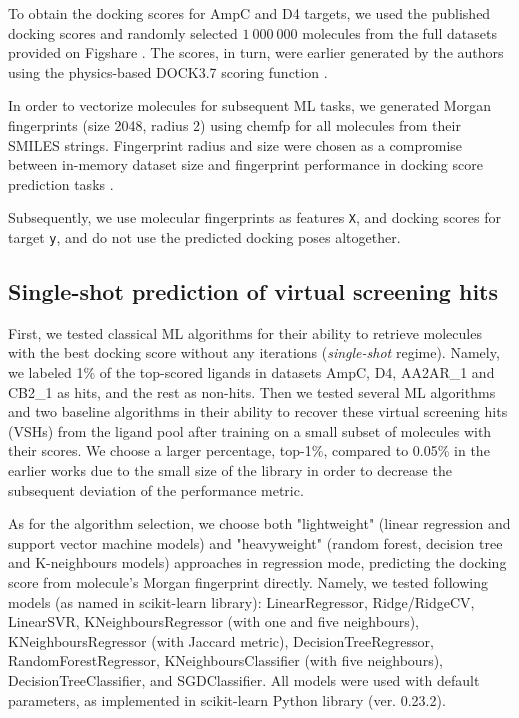 To obtain the docking scores for AmpC and D4 targets, we used the published docking scores \cite{ultralarge_docking_first} and randomly selected $1\ 000\ 000$ molecules from the full datasets provided on Figshare \cite{ultralarge_docking_first}. The scores, in turn, were earlier generated by the authors using the physics-based DOCK3.7 scoring function \cite{Coleman2013}.

In order to vectorize molecules for subsequent ML tasks, we generated Morgan fingerprints (size 2048, radius 2) using chemfp \cite{Dalke2019} for all molecules from their SMILES strings. Fingerprint radius and size were chosen as a compromise between in-memory dataset size and fingerprint performance in docking score prediction tasks \cite{logistic_regression}.

Subsequently, we use molecular fingerprints as features \texttt{X}, and docking scores for target \texttt{y}, and do not use the predicted docking poses altogether.

\subsection{Single-shot prediction of virtual screening hits}
First, we tested classical ML algorithms for their ability to retrieve molecules with the best docking score without any iterations (\textit{single-shot} regime). Namely, we labeled 1\% of the top-scored ligands in datasets AmpC, D4, AA2AR\_1 and CB2\_1 as hits, and the rest as non-hits. Then we tested several ML algorithms and two baseline algorithms in their ability to recover these virtual screening hits (VSHs) from the ligand pool after training on a small subset of molecules with their scores. We choose a larger percentage, top-1\%, compared to 0.05\% in the earlier works  \cite{Graff2021AcceleratingLearning, logistic_regression, Yang2021_shoichet_active_learning} due to the small size of the library in order to decrease the subsequent deviation of the performance metric.

As for the algorithm selection, we choose both "lightweight" (linear regression and support vector machine models) and "heavyweight" (random forest, decision tree and K-neighbours models) approaches in regression mode, predicting the docking score from molecule's Morgan fingerprint directly. Namely, we tested following models (as named in scikit-learn library): LinearRegressor, Ridge/RidgeCV, LinearSVR, KNeighboursRegressor (with one and five neighbours), KNeighboursRegressor (with Jaccard metric), DecisionTreeRegressor, RandomForestRegressor, KNeighboursClassifier (with five neighbours), DecisionTreeClassifier, and SGDClassifier. All models were used with default parameters, as implemented in scikit-learn Python library \cite{scikit-learn} (ver. 0.23.2).

